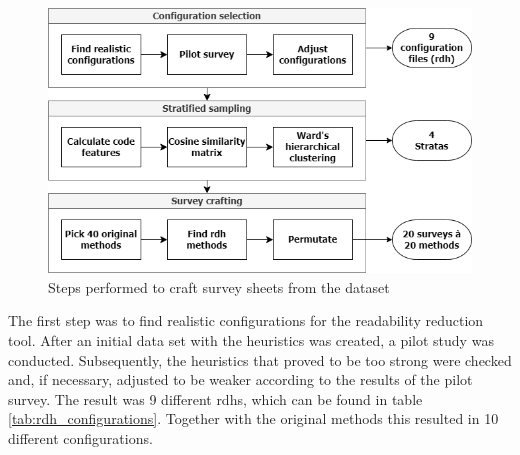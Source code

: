 \documentclass[%
class=scrreprt,
chapterprefix=false,%
open=right,%
twoside=false,%
paper=a4,%
logofile={Logo\_zentral\_farbig\_EN.png},%
thesistype=master,%
UKenglish,%
]{se2thesis}
\theoremstyle{definition}
\begin{document}
	\begin{figure}[t]
		\centering
		\includegraphics[width=\textwidth]{img/survey_pipeline.png}
		\caption{Steps performed to craft survey sheets from the dataset}
		\label{fig:survey_pipeline}
	\end{figure}
		
	The first step was to find realistic configurations for the readability reduction tool. After an initial data set with the heuristics was created, a pilot study was conducted. Subsequently, the heuristics that proved to be too strong were checked and, if necessary, adjusted to be weaker according to the results of the pilot survey. The result was 9 different rdhs, which can be found in table \ref{tab:rdh_configurations}. Together with the original methods this resulted in 10 different configurations.
	
\end{document}
